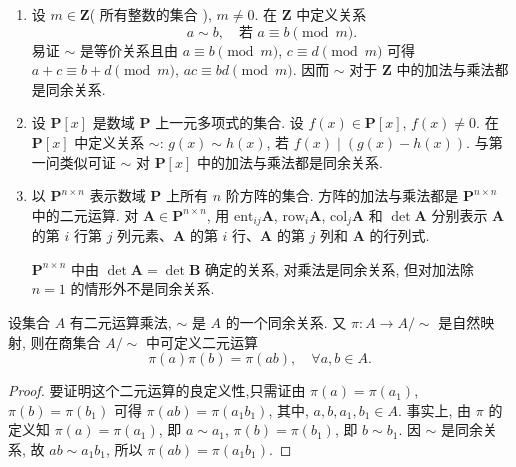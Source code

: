 \documentclass[../../main.tex]{subfiles}
\begin{document}
\begin{example}
\begin{enumerate}
\item 设 \( m \in \mathbf{Z} \)( 所有整数的集合 ), \( m \neq 0 \). 在 \( \mathbf{Z} \) 中定义关系
\[
a \sim b, \quad \text{若 } a \equiv b \pmod{m}.
\]
易证 \( \sim \) 是等价关系且由 \( a \equiv b \pmod{m} \), \( c \equiv d \pmod{m} \) 可得 \( a + c \equiv b + d \pmod{m} \), \( ac \equiv bd \pmod{m} \). 因而 \( \sim \) 对于 \( \mathbf{Z} \) 中的加法与乘法都是同余关系.

\item 设 \( \mathbf{P}[x] \) 是数域 \( \mathbf{P} \) 上一元多项式的集合. 设 \( f(x) \in \mathbf{P}[x] \), \( f(x) \neq 0 \). 在 \( \mathbf{P}[x] \) 中定义关系 \( \sim \): \( g(x) \sim h(x) \), 若 \( f(x) \mid (g(x) - h(x)) \). 与第一问类似可证 \( \sim \) 对 \( \mathbf{P}[x] \) 中的加法与乘法都是同余关系.

\item 以 \( \mathbf{P}^{n \times n} \) 表示数域 \( \mathbf{P} \) 上所有 \( n \) 阶方阵的集合. 方阵的加法与乘法都是 \( \mathbf{P}^{n \times n} \) 中的二元运算. 对 \( \boldsymbol{A} \in \mathbf{P}^{n \times n} \), 用 \( \text{ent}_{ij}\boldsymbol{A} \), \( \text{row}_i\boldsymbol{A} \), \( \text{col}_j\boldsymbol{A} \) 和 \( \det\boldsymbol{A} \) 分别表示 \( \boldsymbol{A} \) 的第 \( i \) 行第 \( j \) 列元素、\( \boldsymbol{A} \) 的第 \( i \) 行、\( \boldsymbol{A} \) 的第 \( j \) 列和 \( \boldsymbol{A} \) 的行列式.

\( \mathbf{P}^{n \times n} \) 中由 \( \det\boldsymbol{A} = \det\boldsymbol{B} \) 确定的关系, 对乘法是同余关系, 但对加法除 \( n = 1 \) 的情形外不是同余关系.
\end{enumerate}
\end{example}

\begin{theorem}\label{theorem:同余关系诱导商集中的乘法-定理1.1.3}
设集合 \( A \) 有二元运算乘法, \( \sim \) 是 \( A \) 的一个同余关系. 又 \( \pi: A \to A/\sim \) 是自然映射, 则在商集合 \( A/\sim \) 中可定义二元运算
\[
\pi(a)\pi(b) = \pi(ab),\quad \forall a,b \in A .
\]
\end{theorem}
\begin{proof}
要证明这个二元运算的良定义性,只需证由 \( \pi(a) = \pi(a_1) \), \( \pi(b) = \pi(b_1) \) 可得 \( \pi(ab) = \pi(a_1b_1) \), 其中, \( a,b,a_1, b_1 \in A \). 事实上, 由 \( \pi \) 的定义知 \( \pi(a) = \pi(a_1) \), 即 \( a \sim a_1 \), \( \pi(b) = \pi(b_1) \), 即 \( b \sim b_1 \). 因 \( \sim \) 是同余关系, 故 \( ab \sim a_1b_1 \), 所以 \( \pi(ab) = \pi(a_1b_1) \).
\end{proof}
\end{document}
